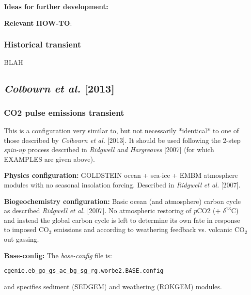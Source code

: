 \documentclass[10pt,twoside]{article}
\begin{document}
\noindent \textbf{Ideas for further development:} 

\noindent \textbf{Relevant HOW-TO}:


\subsubsection{Historical transient}\label{EXAMPLE.worjh2.Caoetal2009.historical}

BLAH


\subsection{\textit{Colbourn et al.} [2013]}

\subsubsection{CO2 pulse emissions transient}\label{EXAMPLE.worbe2.Colbournetal2013.EMISSIONS}

This is a configuration very similar to, but not necessarily *identical* to one of those described by \textit{Colbourn et al.} [2013]. It should be used following the 2-step \textit{spin-up} process described in \textit{Ridgwell and Hargreaves} [2007] (for which EXAMPLES are given above).

\noindent \textbf{Physics configuration:} GOLDSTEIN ocean + sea-ice + EMBM atmosphere modules with no seasonal insolation forcing. Described in \textit{Ridgwell et al.} [2007].

\noindent \textbf{Biogeochemistry configuration:} Basic ocean (and atmosphere) carbon cycle as described \textit{Ridgwell et al.} [2007]. No atmospheric restoring of \textit{p}CO2 (+ $\delta^{13}$C) and instead the global carbon cycle is left to determine its own fate in response to imposed CO$_{2}$ emissions and according to weathering feedback vs. volcanic CO$_{2}$ out-gassing.

\noindent \textbf{Base-config:} The \textit{base-config} file is:
\vspace{-10pt}\begin{verbatim}cgenie.eb_go_gs_ac_bg_sg_rg.worbe2.BASE.config\end{verbatim}\vspace{-10pt}
and specifies sediment (SEDGEM) and weathering (ROKGEM) modules.
\end{document}
